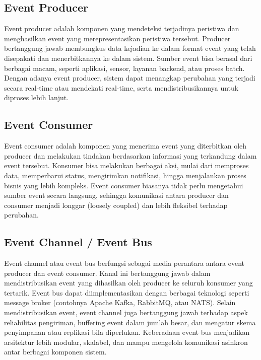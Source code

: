 \subsection{Event Producer}
Event producer adalah komponen yang mendeteksi terjadinya peristiwa dan menghasilkan event yang merepresentasikan peristiwa tersebut. Producer bertanggung jawab membungkus data kejadian ke dalam format event yang telah disepakati dan menerbitkannya ke dalam sistem. Sumber event bisa berasal dari berbagai macam, seperti aplikasi, sensor, layanan backend, atau proses batch. Dengan adanya event producer, sistem dapat menangkap perubahan yang terjadi secara real-time atau mendekati real-time, serta mendistribusikannya untuk diproses lebih lanjut.

\subsection{Event Consumer}
Event consumer adalah komponen yang menerima event yang diterbitkan oleh producer dan melakukan tindakan berdasarkan informasi yang terkandung dalam event tersebut. Konsumer bisa melakukan berbagai aksi, mulai dari memproses data, memperbarui status, mengirimkan notifikasi, hingga menjalankan proses bisnis yang lebih kompleks. Event consumer biasanya tidak perlu mengetahui sumber event secara langsung, sehingga komunikasi antara producer dan consumer menjadi longgar (loosely coupled) dan lebih fleksibel terhadap perubahan.

\subsection{Event Channel / Event Bus}
Event channel atau event bus berfungsi sebagai media perantara antara event producer dan event consumer. Kanal ini bertanggung jawab dalam mendistribusikan event yang dihasilkan oleh producer ke seluruh konsumer yang tertarik. Event bus dapat diimplementasikan dengan berbagai teknologi seperti message broker (contohnya Apache Kafka, RabbitMQ, atau NATS). Selain mendistribusikan event, event channel juga bertanggung jawab terhadap aspek reliabilitas pengiriman, buffering event dalam jumlah besar, dan mengatur skema penyimpanan atau replikasi bila diperlukan. Keberadaan event bus menjadikan arsitektur lebih modular, skalabel, dan mampu mengelola komunikasi asinkron antar berbagai komponen sistem.

